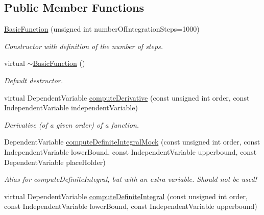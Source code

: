\subsection*{Public Member Functions}
\begin{DoxyCompactItemize}
\item 
\hyperlink{classtudat_1_1basic__mathematics_1_1BasicFunction_a6db9f3a2a2b5be0e10132e2b9b648132}{Basic\+Function} (unsigned int number\+Of\+Integration\+Steps=1000)\hypertarget{classtudat_1_1basic__mathematics_1_1BasicFunction_a6db9f3a2a2b5be0e10132e2b9b648132}{}\label{classtudat_1_1basic__mathematics_1_1BasicFunction_a6db9f3a2a2b5be0e10132e2b9b648132}

\begin{DoxyCompactList}\small\item\em Constructor with definition of the number of steps. \end{DoxyCompactList}\item 
virtual \hyperlink{classtudat_1_1basic__mathematics_1_1BasicFunction_a752b82484f0acb5f8ec1c55ea2dc731b}{$\sim$\+Basic\+Function} ()\hypertarget{classtudat_1_1basic__mathematics_1_1BasicFunction_a752b82484f0acb5f8ec1c55ea2dc731b}{}\label{classtudat_1_1basic__mathematics_1_1BasicFunction_a752b82484f0acb5f8ec1c55ea2dc731b}

\begin{DoxyCompactList}\small\item\em Default destructor. \end{DoxyCompactList}\item 
virtual Dependent\+Variable \hyperlink{classtudat_1_1basic__mathematics_1_1BasicFunction_ae0a0844b6c72c55ef059039eb147453b}{compute\+Derivative} (const unsigned int order, const Independent\+Variable independent\+Variable)
\begin{DoxyCompactList}\small\item\em Derivative (of a given order) of a function. \end{DoxyCompactList}\item 
Dependent\+Variable \hyperlink{classtudat_1_1basic__mathematics_1_1BasicFunction_a629836ffd0ff73670ea1e3182e1ac717}{compute\+Definite\+Integral\+Mock} (const unsigned int order, const Independent\+Variable lower\+Bound, const Independent\+Variable upperbound, const Dependent\+Variable place\+Holder)\hypertarget{classtudat_1_1basic__mathematics_1_1BasicFunction_a629836ffd0ff73670ea1e3182e1ac717}{}\label{classtudat_1_1basic__mathematics_1_1BasicFunction_a629836ffd0ff73670ea1e3182e1ac717}

\begin{DoxyCompactList}\small\item\em Alias for compute\+Definite\+Integral, but with an extra variable. Should not be used! \end{DoxyCompactList}\item 
virtual Dependent\+Variable \hyperlink{classtudat_1_1basic__mathematics_1_1BasicFunction_a9ff1a3c03832150f34c06c86317c2ac7}{compute\+Definite\+Integral} (const unsigned int order, const Independent\+Variable lower\+Bound, const Independent\+Variable upperbound)
\end{DoxyCompactItemize}
